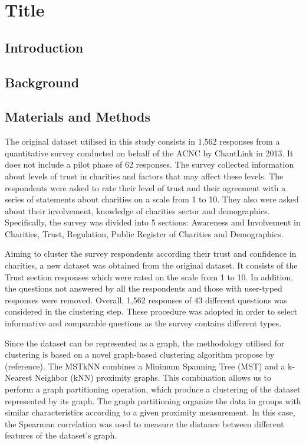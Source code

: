 \documentclass{article}
\begin{document}
\section{Title}

\subsection{Introduction}

\subsection{Background}

\subsection{Materials and Methods}


The original dataset utilised in this study consists in 1,562 responses from a
quantitative survey conducted on behalf of the ACNC by ChantLink in 2013. It
does not include a pilot phase of 62 responses. The survey collected information
about levels of trust in charities and factors that may affect these levels. The
respondents were asked to rate their level of trust and their agreement with a
series of statements about charities on a scale from 1 to 10. They also were
asked about their involvement, knowledge of charities sector and demographics.
Specifically, the survey was divided into 5 sections: Awareness and Involvement
in Charities, Trust, Regulation, Public Register of Charities and Demographics.

Aiming to cluster the survey respondents according their trust and confidence in
charities, a new dataset was obtained from the original dataset. It consists of
the Trust section responses which were rated on the scale from 1 to 10. In
addition, the questions not answered by all the respondents and those with
user-typed responses were removed. Overall, 1,562 responses of 43 different
questions was considered in the clustering step. These procedure was adopted in
order to select informative and comparable questions as the survey contains
different types.

Since the dataset can be represented as a graph, the methodology utilised for
clustering is based on a novel graph-based clustering algorithm propose by
(reference). The MSTkNN combines a Minimum Spanning Tree (MST) and a k-Nearest
Neighbor (kNN) proximity graphs. This combination allows us to perform a graph
partitioning operation, which produce a clustering of the dataset represented by
its graph. The graph partitioning organize the data in groups with similar
characteristics according to a given proximity measurement. In this case, the
Spearman correlation was used to measure the distance between different features
of the dataset's graph.
\end{document}
